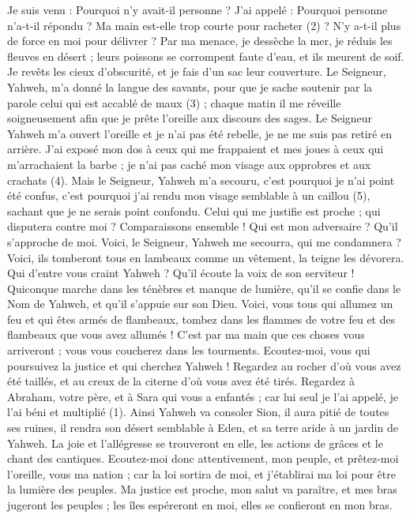 \begin{multicols}{2}
Je suis venu : Pourquoi n’y avait-il personne ? J’ai appelé : Pourquoi personne n’a-t-il répondu ? Ma main est-elle trop courte pour racheter (2) ? N'y a-t-il plus de force en moi pour délivrer ? Par ma menace, je dessèche la mer, je réduis les fleuves en désert ; leurs poissons se corrompent faute d’eau, et ils meurent de soif.
Je revêts les cieux d’obscurité, et je fais d’un sac leur couverture.
Le Seigneur, Yahweh, m'a donné la langue des savants, pour que je sache soutenir par la parole celui qui est accablé de maux (3) ; chaque matin il me réveille soigneusement afin que je prête l'oreille aux discours des sages.
Le Seigneur Yahweh m'a ouvert l'oreille et je n'ai pas été rebelle, je ne me suis pas retiré en arrière.
J'ai exposé mon dos à ceux qui me frappaient et mes joues à ceux qui m’arrachaient la barbe ; je n'ai pas caché mon visage aux opprobres et aux crachats (4).
Mais le Seigneur, Yahweh m'a secouru, c'est pourquoi je n'ai point été confus, c’est pourquoi j'ai rendu mon visage semblable à un caillou (5), sachant que je ne serais point confondu.
Celui qui me justifie est proche ; qui disputera contre moi ? Comparaissons ensemble ! Qui est mon adversaire ? Qu’il s’approche de moi.
Voici, le Seigneur, Yahweh me secourra, qui me condamnera ? Voici, ils tomberont tous en lambeaux comme un vêtement, la teigne les dévorera.
Qui d’entre vous craint Yahweh ? Qu’il écoute la voix de son serviteur ! Quiconque marche dans les ténèbres et manque de lumière, qu’il se confie dans le Nom de Yahweh, et qu'il s'appuie sur son Dieu.
Voici, vous tous qui allumez un feu et qui êtes armés de flambeaux, tombez dans les flammes de votre feu et des flambeaux que vous avez allumés ! C’est par ma main que ces choses vous arriveront ; vous vous coucherez dans les tourments.
\VerseOne{}Ecoutez-moi, vous qui poursuivez la justice et qui cherchez Yahweh ! Regardez au rocher d’où vous avez été taillés, et au creux de la citerne d’où vous avez été tirés.
Regardez à Abraham, votre père, et à Sara qui vous a enfantés ; car lui seul je l'ai appelé, je l'ai béni et multiplié (1).
Ainsi Yahweh va consoler Sion, il aura pitié de toutes ses ruines, il rendra son désert semblable à Eden, et sa terre aride à un jardin de Yahweh. La joie et l'allégresse se trouveront en elle, les actions de grâces et le chant des cantiques.
Ecoutez-moi donc attentivement, mon peuple, et prêtez-moi l'oreille, vous ma nation ; car la loi sortira de moi, et j'établirai ma loi pour être la lumière des peuples.
Ma justice est proche, mon salut va paraître, et mes bras jugeront les peuples ; les îles espéreront en moi, elles se confieront en mon bras.

\end{multicols}
